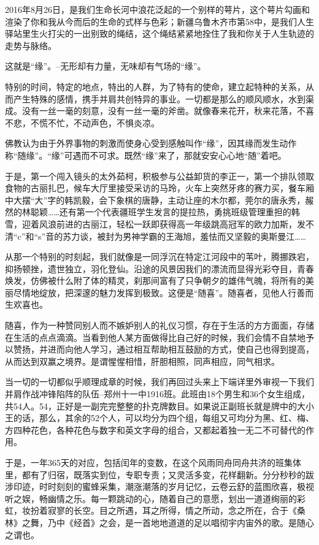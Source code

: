 \documentclass[openany]{ctexbook}
\begin{document}
2016年8月26日，是我们生命长河中浪花泛起的一个别样的萼片，这个萼片勾画和渲染了你和我从今而后的生命的式样与色彩；新疆乌鲁木齐市第58中，是我们人生驿站里生火打尖的一出别致的绳结，这个绳结紧紧地拴住了我和你关于人生轨迹的走势与脉络。

这就是``缘''。--无形却有力量，无味却有气场的``缘''。

特别的时间，特定的地点，特出的人群，为了特有的使命，建立起特种的关系，从而产生特殊的感情，携手并肩共创特异的事业。一切都是那么的顺风顺水，水到渠成。没有一丝一毫的刻意，没有一丝一毫的斧凿。就像春来花开，秋来花落，不喜不悲，不慌不忙，不动声色，不惧炎凉。

佛教认为由于外界事物的刺激而使身心受到感触叫作``缘''，因其缘而发生动作称``随缘''。``缘''可遇而不可求。既然``缘''来了，那就安安心心地``随''着吧。

于是，第一个闯入镜头的太外茹柯，积极参与公益卸货的李正一，第一个排队领取食物的古丽扎巴，候车大厅里接受采访的马玲，火车上突然牙疼的赛力买，餐车厢中大摆``大''字的韩凯毅，会下象棋的唐静，主动让座的木尔都，莞尔的唐永秀，赧然的林聪颖\ldots{}\ldots{}还有第一个代表疆班学生发言的提拉热，勇挑班级管理重担的韩雪，迎着风浪前进的古丽江，轻松一跃即获得高一年级跳高冠军的欧力加斯，发不清``c''和``s''音的苏力谈，被封为男神学霸的王海旭，羞怯而又坚毅的奥斯曼江\ldots{}\ldots{}

从那一个特别的时刻起，我们就像是一同浮沉在特定江河段中的苇叶，腾挪跌宕，抑扬顿挫，遗世独立，羽化登仙。沿途的风景因我们的漂流而显得光彩夺目，青春焕发，仿佛被什么附了体的精灵，刹那间富有了只争朝夕的雄伟气魄，将所有的美丽尽情地绽放，把深邃的魅力发挥到极致。这便是``随喜''。随喜者，见他人行善而生欢喜也。

随喜，作为一种赞同别人而不嫉妒别人的礼仪习惯，存在于生活的方方面面，存储在生活的点点滴滴。当看到他人某方面做得比自己好的时候，我们会情不自禁地予以赞扬，并进而向他人学习，通过相互帮助相互鼓励的方式，使自己也得到提高，从而达到双赢之境界。是谓惺惺相惜，肝胆相照，同声相应，同气相求。

当一切的一切都似乎顺理成章的时候，我们再回过头来上下端详里外审视一下我们并肩作战冲锋陷阵的队伍--郑州十一中1916班。此班由18个男生和36个女生组成，共54人。54，正好是一副完完整整的扑克牌数目。如果说正副班长就是牌中的大小王的话，那么，其余的52个人，可以均分为四个组，每组又可均分为黑、红、梅、方四种花色，各种花色与数字和英文字母的组合，又都起着独一无二不可替代的作用。

于是，一年365天的对应，包括闰年的变数，在这个风雨同舟同舟共济的班集体里，都有了归宿，既落实到位，专职专责；又灵活多变，花样翻新。分分秒秒的跋涉印迹，时时刻刻的蜜蜂采集，潮涨潮落的岁月记忆，云卷云舒的蓝图欣喜，极视听之娱，畅幽情之乐。每一颗跳动的心，随着自己的意愿，划出一道道绚丽的彩虹，妆扮着寂寥的长空。目之所遇，耳之所得，情之所动，念之所在，合于《桑林》之舞，乃中《经首》之会，是一首地地道道的足以唱彻宇内宙外的歌。是随心之谓也。
\end{document}
